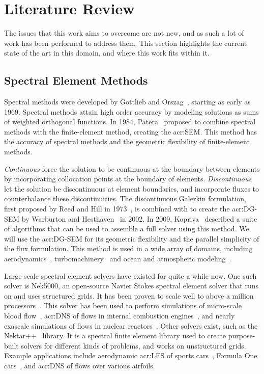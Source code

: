 \chapter{Literature Review}\label{chapter:literature_review} 

The issues that this work aims to overcome are not new, and as such a lot of work has been performed
to address them. This section highlights the current state of the art in this domain, and where this
work fits within it.

\section{Spectral Element Methods}\label{section:literature_review:sem}

Spectral methods were developed by Gottlieb and Orszag~\cite{Gottlieb1977}, starting as early as
1969. Spectral methods attain high order accuracy by modeling solutions as sums of weighted
orthogonal functions. In 1984, Patera~\cite{Patera1984} proposed to combine spectral methods with
the finite-element method, creating the \acrfull{acr:SEM}. This method has the accuracy of spectral
methods and the geometric flexibility of finite-element methods.

\textit{Continuous}  force the solution to be continuous at the boundary between
elements by incorporating collocation points at the boundary of elements. \textit{Discontinuous}
 let the solution be discontinuous at element boundaries, and incorporate fluxes
to counterbalance these discontinuities. The discontinuous Galerkin formulation, first proposed by
Reed and Hill in 1973~\cite{Reed1973}, is combined with  to create the
\acrfull{acr:DG-SEM} by Warburton and Hesthaven~\cite{Hesthaven2002} in 2002. In 2009,
Kopriva~\cite{Kopriva2009} described a suite of algorithms that can be used to assemble a full
solver using this method. We will use the \acrshort{acr:DG-SEM} for its geometric flexibility and
the parallel simplicity of the flux formulation. This method is used in a wide array of domains,
including aerodynamics~\cite{Beck2014}, turbomachinery~\cite{Garai2015} and ocean and atmospheric
modeling~\cite{Gassner2016}.

Large scale spectral element solvers have existed for quite a while now. One such solver is Nek5000,
an open-source Navier Stokes spectral element solver that runs on  and uses
structured grids. It has been proven to scale well to above a million
processors~\cite{Offermans2017}. This solver has been used to perform simulations of micro-scale
blood flow~\cite{Obabko2017}, \acrfull{acr:DNS} of flows in internal combustion
engines~\cite{Ameen2020}, and nearly exascale simulations of flows in nuclear
reactors~\cite{Merzari2020}. Other solvers exist, such as the Nektar++~\cite{Cantwell2015} library.
It is a spectral finite element library used to create purpose-built solvers for different kinds of
problems, and works on unstructured grids. Example applications include aerodynamic
\acrfull{acr:LES} of sports cars~\cite{Mengaldo2020}, Formula One cars~\cite{Cantwell2015}, and
\acrshort{acr:DNS} of flows over various airfoils.

